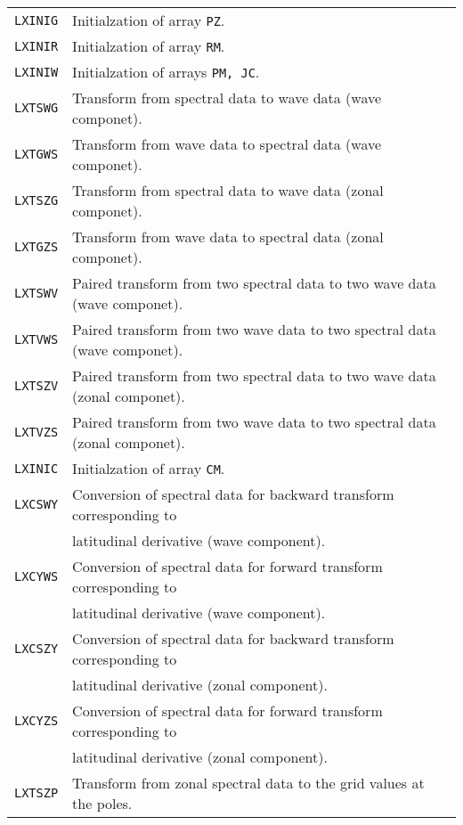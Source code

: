 \documentclass[a4paper]{scrartcl}
\begin{document}
\vspace{1em}
\begin{tabular}{ll}
\texttt{LXINIG} & Initialzation of array \texttt{PZ}.\\
\texttt{LXINIR} & Initialzation of array \texttt{RM}.\\
\texttt{LXINIW} & Initialzation of arrays \texttt{PM, JC}.\\
\texttt{LXTSWG} & Transform from spectral data to wave data (wave componet).\\
\texttt{LXTGWS} & Transform from wave data to spectral data (wave componet).\\
\texttt{LXTSZG} & Transform from spectral data to wave data (zonal componet).\\
\texttt{LXTGZS} & Transform from wave data to spectral data (zonal componet).\\
\texttt{LXTSWV} & Paired transform from two spectral data to two wave data (wave componet).\\
\texttt{LXTVWS} & Paired transform from two wave data to two spectral data (wave componet).\\
\texttt{LXTSZV} & Paired transform from two spectral data to two wave data (zonal componet).\\
\texttt{LXTVZS} & Paired transform from two wave data to two spectral data (zonal componet).\\
\texttt{LXINIC} & Initialzation of array \texttt{CM}.\\
\texttt{LXCSWY} & Conversion of spectral data for backward transform corresponding to \\
& latitudinal derivative (wave component).\\
\texttt{LXCYWS} & Conversion of spectral data for forward transform corresponding to \\
& latitudinal derivative (wave component).\\
\texttt{LXCSZY} & Conversion of spectral data for backward transform corresponding to \\
& latitudinal derivative (zonal component).\\
\texttt{LXCYZS} & Conversion of spectral data for forward transform corresponding to \\
& latitudinal derivative (zonal component).\\
\texttt{LXTSZP} & Transform from zonal spectral data to the grid
values at the poles.
\end{tabular}

\end{document}
